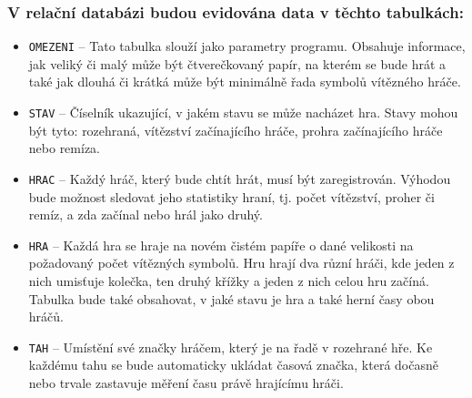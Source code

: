 \documentclass[
11pt,
a4paper,
pdftex,
czech,
titlepage
]{report}
\begin{document}
\subsubsection{V relační databázi budou evidována data v těchto tabulkách:}
\begin{itemize}
    \item \texttt{OMEZENI} -- Tato tabulka slouží jako parametry programu. Obsahuje informace, jak veliký či malý může být čtverečkovaný papír, na kterém se bude hrát a také jak dlouhá či krátká může být minimálně řada symbolů vítězného hráče.
    \item \texttt{STAV} -- Číselník ukazující, v jakém stavu se může nacházet hra. Stavy mohou být tyto: rozehraná, vítězství začínajícího hráče, prohra začínajícího hráče nebo remíza.
    \item \texttt{HRAC} -- Každý hráč, který bude chtít hrát, musí být zaregistrován. Výhodou bude možnost sledovat jeho statistiky hraní, tj. počet vítězství, proher či remíz, a zda začínal nebo hrál jako druhý.
    \item \texttt{HRA} -- Každá hra se hraje na novém čistém papíře o dané velikosti na požadovaný počet vítězných symbolů. Hru hrají dva různí hráči, kde jeden z nich umisťuje kolečka, ten druhý křížky a jeden z nich celou hru začíná. Tabulka bude také obsahovat, v jaké stavu je hra a také herní časy obou hráčů.
    \item \texttt{TAH} -- Umístění své značky hráčem, který je na řadě v rozehrané hře. Ke každému tahu se bude automaticky ukládat časová značka, která dočasně nebo trvale zastavuje měření času právě hrajícímu hráči.
\end{itemize}
\end{document}
